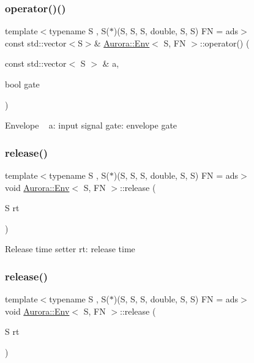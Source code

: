 \subsubsection{\texorpdfstring{operator()()}{operator()()}\hspace{0.1cm}{\footnotesize\ttfamily [6/6]}}
{\footnotesize\ttfamily template$<$typename S , S($\ast$)(\+S, S, S, double, S, S) FN = ads$>$ \\
const std\+::vector$<$S$>$\& \hyperlink{class_aurora_1_1_env}{Aurora\+::\+Env}$<$ S, FN $>$\+::operator() (\begin{DoxyParamCaption}\item[{const std\+::vector$<$ S $>$ \&}]{a,  }\item[{bool}]{gate }\end{DoxyParamCaption})\hspace{0.3cm}{\ttfamily [inline]}}

Envelope ~\newline
a\+: input signal gate\+: envelope gate \mbox{\label{class_aurora_1_1_env_a2e52ca727b587d89e13a6c3832786f22}} 
\subsubsection{\texorpdfstring{release()}{release()}\hspace{0.1cm}{\footnotesize\ttfamily [1/2]}}
{\footnotesize\ttfamily template$<$typename S , S($\ast$)(\+S, S, S, double, S, S) FN = ads$>$ \\
void \hyperlink{class_aurora_1_1_env}{Aurora\+::\+Env}$<$ S, FN $>$\+::release (\begin{DoxyParamCaption}\item[{S}]{rt }\end{DoxyParamCaption})\hspace{0.3cm}{\ttfamily [inline]}}

Release time setter rt\+: release time \mbox{\label{class_aurora_1_1_env_a2e52ca727b587d89e13a6c3832786f22}} 
\subsubsection{\texorpdfstring{release()}{release()}\hspace{0.1cm}{\footnotesize\ttfamily [2/2]}}
{\footnotesize\ttfamily template$<$typename S , S($\ast$)(\+S, S, S, double, S, S) FN = ads$>$ \\
void \hyperlink{class_aurora_1_1_env}{Aurora\+::\+Env}$<$ S, FN $>$\+::release (\begin{DoxyParamCaption}\item[{S}]{rt }\end{DoxyParamCaption})\hspace{0.3cm}{\ttfamily [inline]}}

